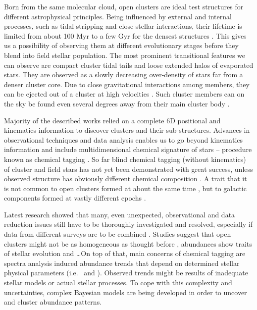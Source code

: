 Born from the same molecular cloud, open clusters are ideal test structures for different astrophysical principles. Being influenced by external and internal processes, such as tidal stripping and close stellar interactions, their lifetime is limited from about 100 Myr to a few Gyr for the densest structures \citep{1998A&A...337..363P, 2013MNRAS.434.2509M}. This gives us a possibility of observing them at different evolutionary stages \citep{2006BASI...34..153C, 2007A&A...468..139P} before they blend \citep{2001A&A...366..827B} into field stellar population. The most prominent transitional features we can observe are compact cluster tidal tails \citep{2019AA...627A...4R, 2019AJ....157..115Y, 2019AA...621L...3M, 2019arXiv191206657Z} and loose extended halos of evaporated stars. They are observed as a slowly decreasing over-density \citep{2002A&A...385..471C, 2004A&A...427..485B, 2019AA...627A.119C} of stars far from a denser cluster core. Due to close gravitational interactions among members, they can be ejected out of a cluster at high velocities \citep{2009MNRAS.396..570G, 2010MNRAS.402..105G, 2017MNRAS.470.3049R}. Such cluster members can on the sky be found even several degrees away from their main cluster body \citep{2007MNRAS.376L..29G, 2018MNRAS.473.4612K, 2019ApJ...884....6M}.

Majority of the described works relied on a complete 6D positional and kinematics information to discover clusters and their sub-structures. Advances in observational techniques and data analysis enables us to go beyond kinematics information and include multidimensional chemical signature of stars -- procedure known as chemical tagging \citep{2002ARA&A..40..487F, 2010ApJ...721..582B}. So far blind chemical tagging (without kinematics) of cluster and field stars has not yet been demonstrated with great success, unless observed structure has obviously different chemical composition \citep{2016ApJ...833..262H}. A trait that it is not common to open clusters formed at about the same time \citep{2019A&A...629A..34G}, but to galactic components formed at vastly different epochs \citep{2018A&A...619A.125A}.

Latest research showed that many, even unexpected, observational and data reduction issues still have to be thoroughly investigated and resolved, especially if data from different surveys are to be combined \citep{2019ARA&A..57..571J}. Studies suggest that open clusters might not be as homogeneous as thought before \citep{2016ApJ...817...49B, 2018MNRAS.473.4612K}, abundances show traits of stellar evolution \citep{2015A&A...577A..47B, 2017ApJ...840...99D, 2018MNRAS.478..425B} and \ldots On top of that, main concerns of chemical tagging are spectra analysis induced abundance trends \citep{2016ApJ...817...49B, 2019arXiv191208539C, 2020arXiv200103179B} that depend on determined stellar physical parameters (i.e. \Teff\ and \vsin). Observed trends might be results of inadequate stellar models or actual stellar processes. To cope with this complexity and uncertainties, complex Bayesian models are being developed \citep{2016ApJ...817...49B, 2019ApJ...887...73C} in order to uncover and cluster abundance patterns.


